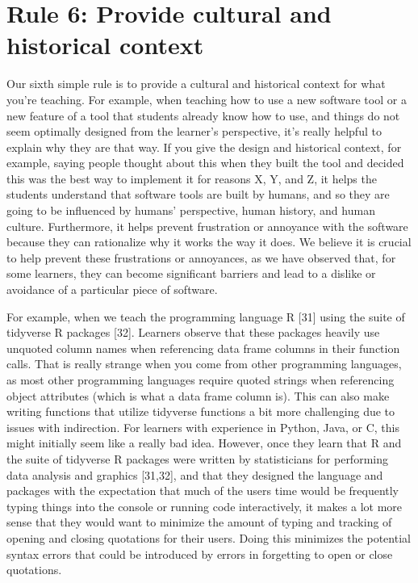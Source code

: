 \documentclass[
  10pt,
  letterpaper,
]{article}
\begin{document}
\section{Rule 6: Provide cultural and historical
context}\label{sec-rule6}

Our sixth simple rule is to provide a cultural and historical context
for what you're teaching. For example, when teaching how to use a new
software tool or a new feature of a tool that students already know how
to use, and things do not seem optimally designed from the learner's
perspective, it's really helpful to explain why they are that way. If
you give the design and historical context, for example, saying people
thought about this when they built the tool and decided this was the
best way to implement it for reasons X, Y, and Z, it helps the students
understand that software tools are built by humans, and so they are
going to be influenced by humans' perspective, human history, and human
culture. Furthermore, it helps prevent frustration or annoyance with the
software because they can rationalize why it works the way it does. We
believe it is crucial to help prevent these frustrations or annoyances,
as we have observed that, for some learners, they can become significant
barriers and lead to a dislike or avoidance of a particular piece of
software.

For example, when we teach the programming language R {[}31{]} using the
suite of tidyverse R packages {[}32{]}. Learners observe that these
packages heavily use unquoted column names when referencing data frame
columns in their function calls. That is really strange when you come
from other programming languages, as most other programming languages
require quoted strings when referencing object attributes (which is what
a data frame column is). This can also make writing functions that
utilize tidyverse functions a bit more challenging due to issues with
indirection. For learners with experience in Python, Java, or C, this
might initially seem like a really bad idea. However, once they learn
that R and the suite of tidyverse R packages were written by
statisticians for performing data analysis and graphics {[}31,32{]}, and
that they designed the language and packages with the expectation that
much of the users time would be frequently typing things into the
console or running code interactively, it makes a lot more sense that
they would want to minimize the amount of typing and tracking of opening
and closing quotations for their users. Doing this minimizes the
potential syntax errors that could be introduced by errors in forgetting
to open or close quotations.
\end{document}
